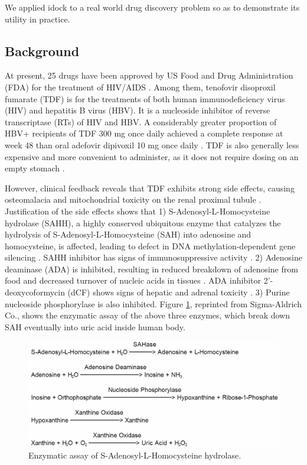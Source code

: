 We applied idock to a real world drug discovery problem so as to demonstrate its utility in practice.

\subsection{Background}

At present, 25 drugs have been approved by US Food and Drug Administration (FDA) for the treatment of HIV/AIDS \citep{300}. Among them, tenofovir disoproxil fumarate (TDF) is for the treatments of both human immunodeficiency virus (HIV) and hepatitis B virus (HBV). It is a nucleoside inhibitor of reverse transcriptase (RTs) of HIV and HBV. A considerably greater proportion of HBV+ recipients of TDF 300 mg once daily achieved a complete response at week 48 than oral adefovir dipivoxil 10 mg once daily \citep{165}. TDF is also generally less expensive and more convenient to administer, as it does not require dosing on an empty stomach \citep{159}.

However, clinical feedback reveals that TDF exhibits strong side effects, causing osteomalacia and mitochondrial toxicity on the renal proximal tubule \citep{185}. Justification of the side effects shows that 1) S-Adenosyl-L-Homocysteine hydrolase (SAHH), a highly conserved ubiquitous enzyme that catalyzes the hydrolysis of S-Adenosyl-L-Homocysteine (SAH) into adenosine and homocysteine, is affected, leading to defect in DNA methylation-dependent gene silencing \citep{182}. SAHH inhibitor has signs of immunosuppressive activity \citep{183}. 2) Adenosine deaminase (ADA) is inhibited, resulting in reduced breakdown of adenosine from food and decreased turnover of nucleic acids in tissues \citep{999}. ADA inhibitor 2'-deoxycoformycin (dCF) shows signs of hepatic and adrenal toxicity \citep{187}. 3) Purine nucleoside phosphorylase is also inhibited. Figure \ref{idock:EnzymaticAssay}, reprinted from Sigma-Aldrich Co., shows the enzymatic assay of the above three enzymes, which break down SAH eventually into uric acid inside human body.

\begin{figure}
\centering
\includegraphics[width=\linewidth]{../idock/EnzymaticAssay.png}
\caption{Enzymatic assay of S-Adenosyl-L-Homocysteine hydrolase.}
\label{idock:EnzymaticAssay}
\end{figure}

